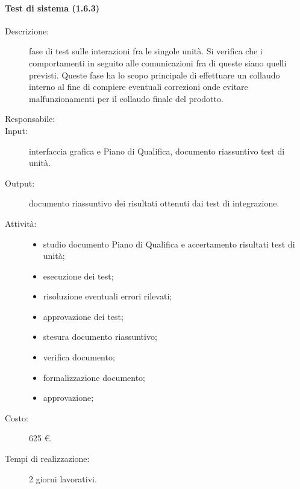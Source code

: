 \paragraph{Test di sistema (1.6.3)}  
\begin{description}
\item[Descrizione:] fase di test sulle interazioni fra le singole unit\`{a}. Si verifica che i comportamenti in seguito alle comunicazioni fra di queste siano quelli previsti. Queste fase ha lo scopo principale di effettuare un collaudo interno al fine di compiere eventuali correzioni onde evitare malfunzionamenti per il collaudo finale del prodotto.
\item[Responsabile:] 
\item[Input:] interfaccia grafica e Piano di Qualifica, documento riassuntivo test di unit\`{a}.
\item[Output:] documento riassuntivo dei risultati ottenuti dai test di integrazione.
\item[Attivit\`{a}:] 
\begin{center}
\begin{itemize}
\item studio documento Piano di Qualifica e accertamento risultati test di unit\`{a};
\item esecuzione dei test;
\item risoluzione eventuali errori rilevati;
\item approvazione dei test;
\item stesura documento riassuntivo;
\item verifica documento;
\item formalizzazione documento;
\item approvazione;
\end{itemize}
\end{center}
\item[Costo:] 625 \euro{}.
\item[Tempi di realizzazione:] 2 giorni lavorativi.
\end{description}

